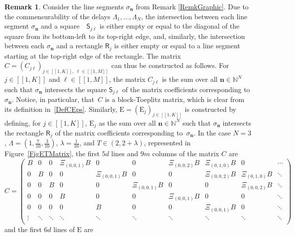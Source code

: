 \documentclass[10pt]{article}
\newcommand{\bn}{\boldsymbol{n}}
\newcommand{\llbracket}{[\![}
\newcommand{\rrbracket}{]\!]}
\theoremstyle{plain}
\theoremstyle{definition}
\newtheorem{remk}[theo]{Remark}
\newcommand{\Epsilon}{\mathrm E}
\numberwithin{equation}{section}\numberwithin{figure}{section}\emergencystretch=3em
\begin{document}
\begin{remk}
Consider the line segments $\sigma_{\bn}$ from Remark \ref{RemkGraphic}. Due to the commensurability of the delays $\Lambda_1, \dots, \Lambda_N$, the intersection between each line segment $\sigma_{\bn}$ and a square~ $\mathsf S_{j\ell}$ is either empty or equal to the diagonal of the square from its bottom-left to its top-right edge, and, similarly, the intersection between each $\sigma_{\bn}$ and a rectangle $\mathsf R_j$ is either empty or equal to a line segment starting at the top-right edge of the rectangle. The matrix $C = \left(C_{j\ell}\right)_{j \in \llbracket 1, K\rrbracket,\; \ell \in \llbracket 1, M\rrbracket}$ can thus be constructed as follows. For \hbox{$j \in \llbracket 1, K\rrbracket$} and $\ell \in \llbracket 1, M\rrbracket$, the matrix $C_{j\ell}$ is the sum over all $\bn \in \mathbb N^N$ such that $\sigma_{\bn}$ intersects the square $\mathsf S_{j\ell}$ of the matrix coefficients corresponding to $\sigma_{\bn}$. Notice, in particular, that~$C$ is a block-Toeplitz matrix, which is clear from its definition in~\eqref{DefCEps}. Similarly, $\Epsilon = \left(\Epsilon_j\right)_{j \in \llbracket 1, K\rrbracket}$ is constructed by defining, for $j \in \llbracket 1, K\rrbracket$, $\Epsilon_j$ as the sum over all \hbox{$\bn \in \mathbb N^N$} such that $\sigma_{\bn}$ intersects the rectangle $\mathsf R_{j}$ of the matrix coefficients corresponding to~$\sigma_{\bn}$. In the case $N = 3$, $\Lambda = \left(1, \frac{7}{10}, \frac{3}{10}\right)$, $\lambda = \frac{1}{10}$, and $T \in (2, 2 + \lambda)$, represented in Figure~\ref{FigETMatrix}, the first $5d$ lines and $9m$ columns of the matrix $C$ are
\begin{equation*}
C =
\begin{pmatrix}
B & 0 & 0 & \Xi_{(0, 0, 1)} B & 0 & 0 & \Xi_{(0, 0, 2)} B & \Xi_{(0, 1, 0)} B & 0 & \cdots \\
0 & B & 0 & 0 & \Xi_{(0, 0, 1)} B & 0 & 0 & \Xi_{(0, 0, 2)} B & \Xi_{(0, 1, 0)} B & \ddots \\
0 & 0 & B & 0 & 0 & \Xi_{(0, 0, 1)} B & 0 & 0 & \Xi_{(0, 0, 2)} B & \ddots \\
0 & 0 & 0 & B & 0 & 0 & \Xi_{(0, 0, 1)} B & 0 & 0 & \ddots \\
0 & 0 & 0 & 0 & B & 0 & 0 & \Xi_{(0, 0, 1)} B & 0 & \ddots \\
\vdots & \ddots & \ddots & \ddots & \ddots & \ddots & \ddots & \ddots & \ddots & \ddots \\
\end{pmatrix}
\end{equation*}
and the first $6d$ lines of $\Epsilon$ are

\end{remk}
\end{document}
